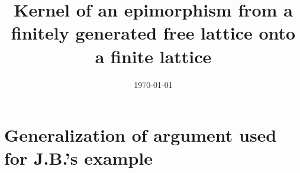   \theoremstyle{plain}
  \newtheorem{theorem}{Theorem}[section]
  \newtheorem{lemma}[theorem]{Lemma}
  \newtheorem{proposition}[theorem]{Proposition}
  \newtheorem{prop}[theorem]{Prop.}
  \theoremstyle{definition}
  \newtheorem{conjecture}{Conjecture}
  \newtheorem{claim}[theorem]{Claim}
  \newtheorem{subclaim}{Subclaim}
  \newtheorem{corollary}[theorem]{Corollary}
  \newtheorem{definition}[theorem]{Definition}
  \newtheorem{notation}[theorem]{Notation}
  \newtheorem{Fact}[theorem]{Fact}
  \newtheorem*{fact}{Fact}
  \newtheorem{example}[theorem]{Example}
  \newtheorem{examples}[theorem]{Examples}
  \newtheorem{exercise}{Exercise}
  \newtheorem*{lem}{Lemma}
  \newtheorem*{cor}{Corollary}
  \newtheorem*{remark}{Remark}
  \newtheorem*{remarks}{Remarks}
  \newtheorem*{obs}{Observation}
  
  \title[Kernel of $\alg F(X) \twoheadrightarrow \alg L$]{Kernel of an epimorphism from a finitely generated free lattice 
  onto a finite lattice}
  
  
  
  
  \date{\today}
  
  
  
  \maketitle
  
  \section{Generalization of argument used for J.B.'s example}

